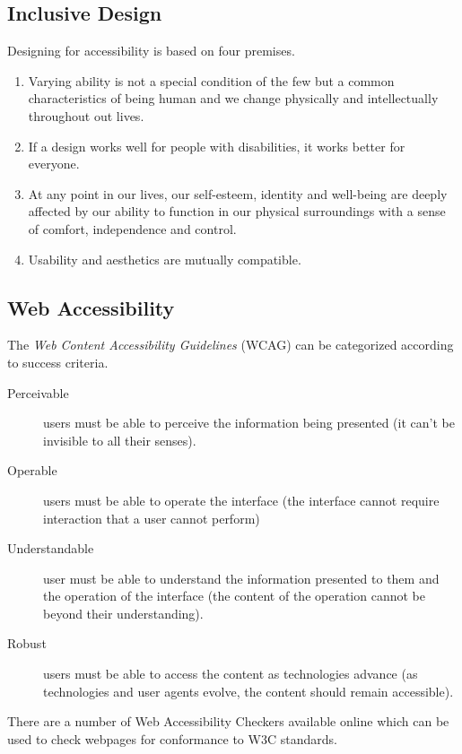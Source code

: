 \subsection{Inclusive Design}
Designing for accessibility is based on four premises.
\begin{enumerate}
    \item Varying ability is not a special condition of the few but a common characteristics of being human and we change physically and intellectually throughout out lives.
    \item If a design works well for people with disabilities, it works better for everyone.
    \item At any point in our lives, our self-esteem, identity and well-being are deeply affected by our ability to function in our physical surroundings with a sense of comfort, independence and control.
    \item Usability and aesthetics are mutually compatible. 
\end{enumerate}

\subsection{Web Accessibility}
The \textit{Web Content Accessibility Guidelines} (WCAG) can be categorized according to success criteria.
\begin{description}
    \item[Perceivable] users must be able to perceive the information being presented (it can't be invisible to all their senses).
    \item[Operable] users must be able to operate the interface (the interface cannot require interaction that a user cannot perform)
    \item[Understandable] user must be able to understand the information presented to them and the operation of the interface (the content of the operation cannot be beyond their understanding). 
    \item[Robust] users must be able to access the content as technologies advance (as technologies and user agents evolve, the content should remain accessible).
\end{description}

There are a number of Web Accessibility Checkers available online which can be used to check webpages for conformance to W3C standards. 